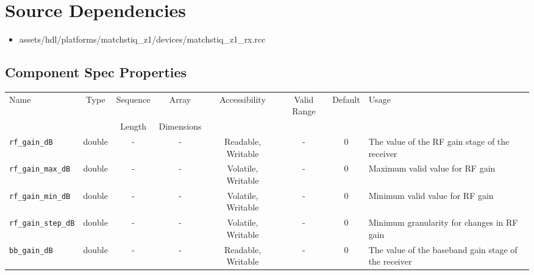 \section*{Source Dependencies}
\begin{itemize}
	\item assets/hdl/platforms/matchstiq\_z1/devices/matchstiq\_z1\_rx.rcc
\end{itemize}

\begin{landscape}
	\section*{Component Spec Properties}
	\begin{scriptsize}
		\begin{tabular}{|p{4cm}|c|c|c|c|c|c|p{8cm}|}
			\hline
			\rowcolor{blue}
			Name                                & Type   & Sequence & Array      & Accessibility       & Valid Range & Default & Usage                                                                                      \\
			\rowcolor{blue}
			                                    &        & Length   & Dimensions &                     &             &         &                                                                                            \\
			\hline
			\verb+rf_gain_dB+                   & double & -        & -          & Readable, Writable  & -           & 0       & The value of the RF gain stage of the receiver                                             \\
			\hline
			\verb+rf_gain_max_dB+               & double & -        & -          & Volatile, Writable & -           & 0       & Maximum valid value for RF gain                                                            \\
			\hline
			\verb+rf_gain_min_dB+               & double & -        & -          & Volatile, Writable & -           & 0       & Minimum valid value for RF gain                                                            \\
			\hline
			\verb+rf_gain_step_dB+              & double & -        & -          & Volatile, Writable & -           & 0       & Minimum granularity for changes in RF gain                                                 \\
			\hline
			\verb+bb_gain_dB+                   & double & -        & -          & Readable, Writable  & -           & 0       & The value of the baseband gain stage of the receiver                                       \\

\end{tabular}
\end{scriptsize}
\end{landscape}

